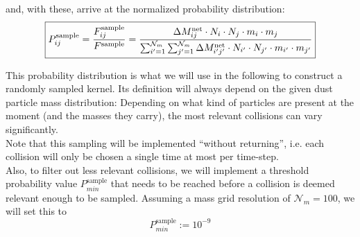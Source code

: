     and, with these, arrive at the normalized probability distribution: 
    \begin{align}
        \boxed{
        P_{ij}^\text{sample} 
            = \frac{F_{ij}^\text{sample}}{F^\text{sample}} 
            = \frac{
                \Delta M_{ij}^\text{net} \cdot N_i \cdot N_j \cdot m_i \cdot m_j
            }{
                \sum_{i'=1}^{\mathcal N_m} \sum_{j'=1}^{\mathcal N_m} 
                \Delta M_{i'j'}^\text{net} \cdot N_{i'} \cdot N_{j'} 
                \cdot m_{i'} \cdot m_{j'}
            }
        }
    \end{align}

    This probability distribution is what we will use in the following to construct a randomly
    sampled kernel. Its definition will always depend on the given dust particle mass 
    distribution: Depending on 
    what kind of particles are present at the moment (and the masses they carry), the most 
    relevant collisions can vary significantly. \\ 

    Note that this sampling will be implemented ``without returning'', i.e. each collision 
    will only be chosen a single time at most per time-step. \\

    Also, to filter out less relevant collisions, we will implement a threshold probability 
    value $P^\text{sample}_{min}$ that needs to be reached before a collision is deemed relevant 
    enough to be sampled. Assuming a mass grid resolution of $\mathcal N_m=100$, we will set this to
    \begin{equation}
        P^\text{sample}_{min} := 10^{-9}
    \end{equation}



